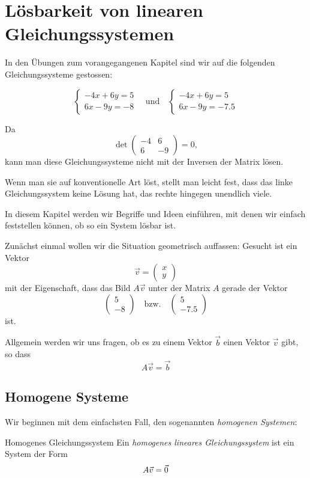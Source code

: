 \section{Lösbarkeit von linearen Gleichungssystemen}
\label{sec:LoesbarkeitVonLGS}
In den Übungen zum vorangegangenen Kapitel sind wir auf die folgenden Gleichungssysteme gestossen:

\[
\begin{cases}
-4x + 6y = 5 \\
6x - 9y = -8
\end{cases}
\quad \text{und} \quad
\begin{cases}
-4x + 6y = 5 \\
6x - 9y = -7.5
\end{cases}
\]

Da 
\[
\det \begin{pmatrix} -4 & 6 \\ 6 & -9 \end{pmatrix} = 0,
\]
kann man diese Gleichungssysteme nicht mit der Inversen der Matrix lösen.

Wenn man sie auf konventionelle Art löst, stellt man leicht fest, dass das linke Gleichungssystem keine Lösung hat, das rechte hingegen unendlich viele.

\medskip

In diesem Kapitel werden wir Begriffe und Ideen einführen, mit denen wir einfach feststellen können, ob so ein System lösbar ist.

Zunächst einmal wollen wir die Situation geometrisch auffassen:  
Gesucht ist ein Vektor
\[
\vec{v} = \begin{pmatrix} x \\ y \end{pmatrix}
\]
mit der Eigenschaft, dass das Bild \( A\vec{v} \) unter der Matrix \( A \) gerade der Vektor
\[
\begin{pmatrix} 5 \\ -8 \end{pmatrix} \quad \text{bzw.} \quad \begin{pmatrix} 5 \\ -7.5 \end{pmatrix}
\]
ist.

Allgemein werden wir uns fragen, ob es zu einem Vektor \( \vec{b} \) einen Vektor \( \vec{v} \) gibt, so dass
\[
A\vec{v} = \vec{b}
\]

\subsection{Homogene Systeme}
\label{sec:HomogeneSysteme}
Wir beginnen mit dem einfachsten Fall, den sogenannten \emph{homogenen Systemen}:
\begin{definition}{Homogenes Gleichungssystem}{}
Ein \emph{homogenes lineares Gleichungssystem} ist ein System der Form
\[
A\vec{v} = \vec{0} \\
\]

\end{definition}

